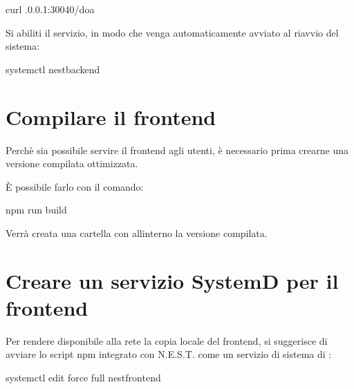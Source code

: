 \documentclass[letterpaper,10pt,italian]{sphinxmanual}
\begin{document}
\begin{sphinxVerbatim}[commandchars=\\\{\}]
curl .0.0.1:30040/doa
\end{sphinxVerbatim}

\sphinxAtStartPar
Si abiliti il servizio, in modo che venga automaticamente avviato al riavvio del sistema:

\begin{sphinxVerbatim}[commandchars=\\\{\}]
systemctl  nest\PYGZhy{}backend
\end{sphinxVerbatim}


\section{Compilare il frontend}
\label{\detokenize{guide/installation:compilare-il-frontend}}
\sphinxAtStartPar
Perchè sia possibile servire il frontend agli utenti, è necessario prima crearne una versione compilata ottimizzata.

\sphinxAtStartPar
È possibile farlo con il comando:

\begin{sphinxVerbatim}[commandchars=\\\{\}]
npm run build
\end{sphinxVerbatim}

\sphinxAtStartPar
Verrà creata una cartella  con all\textquotesingle{}interno la versione compilata.


\section{Creare un servizio SystemD per il frontend}
\label{\detokenize{guide/installation:creare-un-servizio-systemd-per-il-frontend}}
\sphinxAtStartPar
Per rendere disponibile alla rete la copia locale del frontend, si suggerisce di avviare lo script npm 
integrato con N.E.S.T. come un servizio di sistema di :

\begin{sphinxVerbatim}[commandchars=\\\{\}]
systemctl edit \PYGZhy{}\PYGZhy{}force \PYGZhy{}\PYGZhy{}full nest\PYGZhy{}frontend
\end{sphinxVerbatim}
\end{document}
